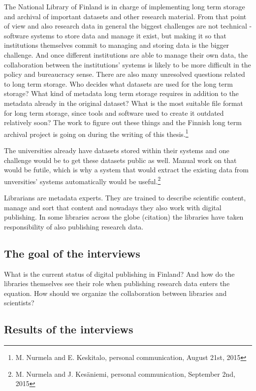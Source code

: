 The National Library of Finland is in charge of implementing long term storage
and archival of important datasets and other research material. From that point
of view and also research data in general the biggest challenges are not
technical - software systems to store data and manage it exist, but making it
so that institutions themselves commit to managing and storing data is the
bigger challenge. And once different institutions are able to manage their own
data, the collaboration between the institutions' systems is likely to be
more difficult in the policy and bureaucracy sense. There are also many
unresolved questions related to long term storage. Who decides what datasets
are used for the long term storage? What kind of metadata long term storage
requires in addition to the metadata already in the original dataset? What
is the most suitable file format for long term storage, since tools and
software used to create it outdated relatively soon? The work
to figure out these things and the Finnish long term archival project is going
on during the writing of this thesis.\footnote{M. Nurmela and E. Keskitalo, personal communication, August 21st, 2015}

The universities already have datasets stored within their systems and one
challenge would be to get these datasets public as well. Manual work on that
would be futile, which is why a system that would extract the existing data
from unversities' systems automatically would be useful.\footnote{M. Nurmela
and J. Kesäniemi, personal communication, September 2nd, 2015}

\iffalse
Librarians are metadata experts. They are trained to describe scientific
content, manage and sort that content and nowadays they also work with digital
publishing. In some libraries across the globe (citation) the libraries have
taken responsibility of also publishing research data.

\subsection{The goal of the interviews}

What is the current status of digital publishing in Finland? And how do the
libraries themselves see their role when publishing research data enters the
equation. How should we organize the collaboration between libraries and
scientists?

\subsection{Results of the interviews}

